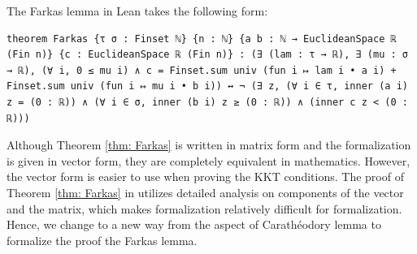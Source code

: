 \documentclass[sn-mathphys]{JORSC-jnl}%
\theoremstyle{thmstyleone}%
\theoremstyle{thmstylethree}%
\begin{document}
The Farkas lemma in Lean takes the following form:
\begin{lstlisting}
theorem Farkas {τ σ : Finset ℕ} {n : ℕ} {a b : ℕ → EuclideanSpace ℝ (Fin n)} {c : EuclideanSpace ℝ (Fin n)} : (∃ (lam : τ → ℝ), ∃ (mu : σ → ℝ), (∀ i, 0 ≤ mu i) ∧ c = Finset.sum univ (fun i ↦ lam i • a i) + Finset.sum univ (fun i ↦ mu i • b i)) ↔ ¬ (∃ z, (∀ i ∈ τ, inner (a i) z = (0 : ℝ)) ∧ (∀ i ∈ σ, inner (b i) z ≥ (0 : ℝ)) ∧ (inner c z < (0 : ℝ)))
\end{lstlisting}
Although Theorem \ref{thm: Farkas} is written in matrix form and the formalization is given in vector form, they are completely equivalent in mathematics. However, the vector form is easier to use when proving the KKT conditions. The proof of Theorem \ref{thm: Farkas} in \cite{nocedal1999numerical} utilizes detailed analysis on components of the vector and the matrix, which makes formalization relatively difficult for formalization. Hence, we change to a new way from the aspect of Carathéodory lemma to formalize the proof the Farkas lemma. %
\end{document}
